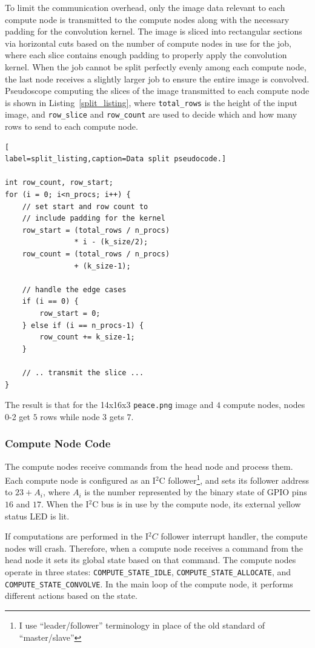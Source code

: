 \documentclass[conference]{IEEEtran}
\begin{document}
To limit the communication overhead, only the image data relevant to each compute node is transmitted to the compute nodes along with the necessary padding for the convolution kernel.
The image is sliced into rectangular sections via horizontal cuts based on the number of compute nodes in use for the job, where each slice contains enough padding to properly apply the convolution kernel.
When the job cannot be split perfectly evenly among each compute node, the last node receives a slightly larger job to ensure the entire image is convolved. 
Pseudoscope computing the slices of the image transmitted to each compute node is shown in Listing~\ref{split_listing}, where \texttt{total\_rows} is the height of the input image, and \texttt{row\_slice} and \texttt{row\_count} are used to decide which and how many rows to send to each compute node.

\begin{lstlisting}[
label=split_listing,caption=Data split pseudocode.]

int row_count, row_start;
for (i = 0; i<n_procs; i++) {
    // set start and row count to
    // include padding for the kernel
    row_start = (total_rows / n_procs)
                * i - (k_size/2);
    row_count = (total_rows / n_procs) 
                + (k_size-1);

    // handle the edge cases
    if (i == 0) {
        row_start = 0;
    } else if (i == n_procs-1) {
        row_count += k_size-1;
    }

    // .. transmit the slice ...
}
\end{lstlisting}

The result is that for the 14x16x3 \texttt{peace.png} image and $4$ compute nodes, nodes 0-2 get $5$ rows while node 3 gets $7$.

\subsubsection{Compute Node Code}
\label{compute_node_sec}
The compute nodes receive commands from the head node and process them. 
Each compute node is configured as an I$^2$C follower\footnote{I use ``leader/follower'' terminology in place of the old standard of ``master/slave''}, and sets its follower address to $23 + A_i$, where $A_i$ is the number represented by the binary state of GPIO pins $16$ and $17$.
When the I$^2$C bus is in use by the compute node, its external yellow status LED is lit.

If computations are performed in the I$^2C$ follower interrupt handler, the compute nodes will crash. 
Therefore, when a compute node receives a command from the head node it sets its global state based on that command.
The compute nodes operate in three states: \texttt{COMPUTE\_STATE\_IDLE}, \texttt{COMPUTE\_STATE\_ALLOCATE}, and \texttt{COMPUTE\_STATE\_CONVOLVE}.
In the main loop of the compute node, it performs different actions based on the state.
\end{document}
